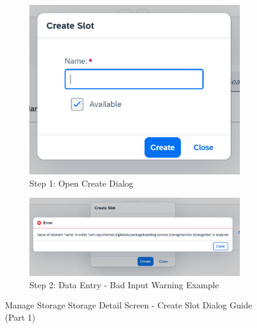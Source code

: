 \begin{figure}[htb]
    \centering
    \begin{subfigure}{0.45\linewidth}
        \includegraphics[width=\linewidth]{images/user_doc/storage/StorageObjectPage/createSlotDlg.png}
        \caption{Step 1: Open Create Dialog}
    \end{subfigure}
    \hspace{10pt}
    \begin{subfigure}{0.45\linewidth}
        \includegraphics[width=\linewidth]{images/user_doc/storage/StorageObjectPage/createSlotBadInput.png}
        \caption{Step 2: Data Entry - Bad Input Warning Example}
    \end{subfigure}

    \caption{Manage Storage Storage Detail Screen - Create Slot Dialog Guide (Part 1)}
    \label{fig:MSobjCreateSlotGuide1}
\end{figure}

